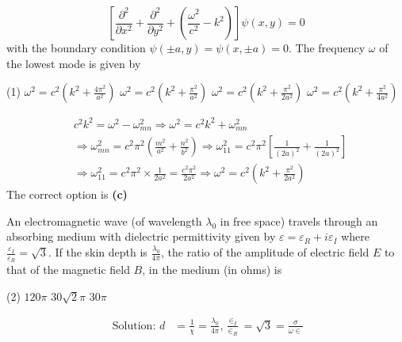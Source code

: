 \begin{enumerate}
\begin{minipage}{\textwidth}
	$$
	\left[\frac{\partial^{2}}{\partial x^{2}}+\frac{\partial^{2}}{\partial y^{2}}+\left(\frac{\omega^{2}}{c^{2}}-k^{2}\right)\right] \psi(x, y)=0
	$$
	with the boundary condition $\psi(\pm a, y)=\psi(x, \pm a)=0$. The frequency $\omega$ of the lowest mode is given by
\end{minipage}
\begin{tasks}(1)
	\task[\textbf{A.}] $\omega^{2}=c^{2}\left(k^{2}+\frac{4 \pi^{2}}{a^{2}}\right)$
	\task[\textbf{B.}]$\omega^{2}=c^{2}\left(k^{2}+\frac{\pi^{2}}{a^{2}}\right)$
	\task[\textbf{C.}]$\omega^{2}=c^{2}\left(k^{2}+\frac{\pi^{2}}{2 a^{2}}\right)$
	\task[\textbf{D.}]$\omega^{2}=c^{2}\left(k^{2}+\frac{\pi^{2}}{4 a^{2}}\right)$
\end{tasks}
\begin{answer}
	$$
	\begin{aligned}
	& c^{2} k^{2}=\omega^{2}-\omega_{m n}^{2} \Rightarrow \omega^{2}=c^{2} k^{2}+\omega_{m n}^{2} \\
	&\Rightarrow \omega_{m n}^{2}=c^{2} \pi^{2}\left(\frac{m^{2}}{a^{2}}+\frac{n^{2}}{b^{2}}\right) \Rightarrow \omega_{11}^{2}=c^{2} \pi^{2}\left[\frac{1}{(2 a)^{2}}+\frac{1}{(2 a)^{2}}\right] \\
	&\Rightarrow \omega_{11}^{2}=c^{2} \pi^{2} \times \frac{1}{2 a^{2}}=\frac{c^{2} \pi^{2}}{2 a^{2}} \Rightarrow \omega^{2}=c^{2}\left(k^{2}+\frac{\pi^{2}}{2 a^{2}}\right)
	\end{aligned}
	$$
	The correct option is \textbf{(c)}	
\end{answer}
\begin{minipage}{\textwidth}
	\item An electromagnetic wave (of wavelength $\lambda_{0}$ in free space) travels through an absorbing medium with dielectric permittivity given by $\varepsilon=\varepsilon_{R}+i \varepsilon_{I}$ where $\frac{\varepsilon_{I}}{\varepsilon_{R}}=\sqrt{3}$. If the skin depth is $\frac{\lambda_{0}}{4 \pi}$, the ratio of the amplitude of electric field $E$ to that of the magnetic field $B$, in the medium (in ohms) is
\end{minipage}
\begin{tasks}(2)
	\task[\textbf{A.}] $120 \pi$
	\task[\textbf{C.}]$30 \sqrt{2} \pi$
	\task[\textbf{D.}] $30 \pi$
\end{tasks}
\begin{answer}
	$$
	\begin{aligned}
	\text { Solution: } d &=\frac{1}{\chi}=\frac{\lambda_{0}}{4 \pi}, \frac{\in_{I}}{\in_{R}}=\sqrt{3}=\frac{\sigma}{\omega \in} \\

\end{aligned}$$
\end{answer}
\end{enumerate}
